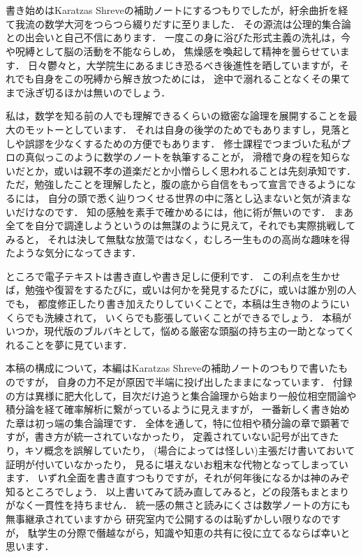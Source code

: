 \chapter*{}
書き始めはKaratzas Shreveの補助ノートにするつもりでしたが，紆余曲折を経て我流の数学大河をつらつら綴りだすに至りました．
その源流は公理的集合論との出会いと自己不信にあります．
一度この身に浴びた形式主義の洗礼は，今や呪縛として脳の活動を不能ならしめ，
焦燥感を喚起して精神を曇らせています．
日々鬱々と，大学院生にあるまじき恐るべき後進性を晒していますが，それでも自身をこの呪縛から解き放つためには，
途中で溺れることなくその果てまで泳ぎ切るほかは無いのでしょう．

私は，数学を知る前の人でも理解できるくらいの緻密な論理を展開することを最大のモットーとしています．
それは自身の後学のためでもありますし，見落としや誤謬を少なくするための方便でもあります．
修士課程でつまづいた私がプロの真似っこのように数学のノートを執筆することが，
滑稽で身の程を知らないだとか，或いは親不孝の道楽だとか小憎らしく思われることは先刻承知です．
ただ，勉強したことを理解したと，腹の底から自信をもって宣言できるようになるには，
自分の頭で悉く辿りつくせる世界の中に落とし込まないと気が済まないだけなのです．
知の感触を素手で確かめるには，他に術が無いのです．
まあ全てを自分で調達しようというのは無謀のように見えて，それでも実際挑戦してみると，
それは決して無駄な放蕩ではなく，むしろ一生ものの高尚な趣味を得たような気分になってきます．

ところで電子テキストは書き直しや書き足しに便利です．
この利点を生かせば，勉強や復習をするたびに，或いは何かを発見するたびに，或いは誰か別の人でも，
都度修正したり書き加えたりしていくことで，本稿は生き物のようにいくらでも洗練されて，
いくらでも膨張していくことができるでしょう．
本稿がいつか，現代版のブルバキとして，悩める厳密な頭脳の持ち主の一助となってくれることを夢に見ています．

本稿の構成について，本編はKaratzas Shreveの補助ノートのつもりで書いたものですが，
自身の力不足が原因で半端に投げ出したままになっています．
付録の方は異様に肥大化して，目次だけ追うと集合論理から始まり一般位相空間論や積分論を経て確率解析に繋がっているように見えますが，
一番新しく書き始めた章は初っ端の集合論理です．
全体を通して，特に位相や積分論の章で顕著ですが，書き方が統一されていなかったり，
定義されていない記号が出てきたり，キソ概念を誤解していたり，
(場合によっては怪しい)主張だけ書いておいて証明が付いていなかったり，
見るに堪えないお粗末な代物となってしまっています．
いずれ全面を書き直すつもりですが，それが何年後になるかは神のみぞ知るところでしょう．
以上書いてみて読み直してみると，どの段落もまとまりがなく一貫性を持ちません．
統一感の無さと読みにくさは数学ノートの方にも無事継承されていますから
研究室内で公開するのは恥ずかしい限りなのですが，
駄学生の分際で僭越ながら，知識や知恵の共有に役に立てるならば幸いと思います．
\\
\\
\\
